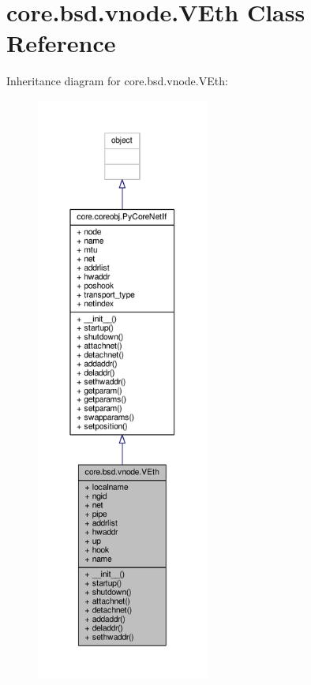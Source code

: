 \hypertarget{classcore_1_1bsd_1_1vnode_1_1_v_eth}{\section{core.\+bsd.\+vnode.\+V\+Eth Class Reference}
\label{classcore_1_1bsd_1_1vnode_1_1_v_eth}
}


Inheritance diagram for core.\+bsd.\+vnode.\+V\+Eth\+:
\nopagebreak
\begin{figure}[H]
\begin{center}
\leavevmode
\includegraphics[height=550pt]{classcore_1_1bsd_1_1vnode_1_1_v_eth__inherit__graph}
\end{center}
\end{figure}


